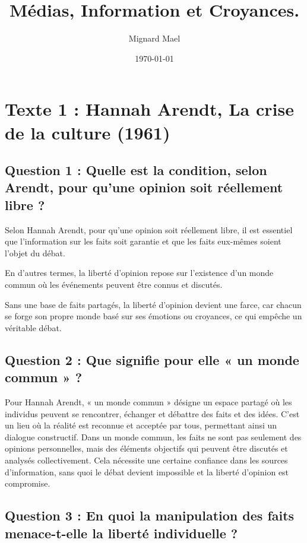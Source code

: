 \documentclass[a4paper,12pt]{article}
\title{Médias, Information et Croyances.}
\author{Mignard Mael}
\date{\today}
\begin{document}
\maketitle

\section*{Texte 1 : Hannah Arendt, La crise de la culture (1961)}
\vspace{1cm}

\subsection*{Question 1 : Quelle est la condition, selon Arendt, pour qu’une opinion soit réellement libre ?}
Selon Hannah Arendt, pour qu’une opinion soit réellement libre, il est essentiel que l’information sur les faits soit garantie et que les faits eux-mêmes soient l’objet du débat. 

En d'autres termes, la liberté d’opinion repose sur l’existence d’un monde commun où les événements peuvent être connus et discutés. 

Sans une base de faits partagés, la liberté d’opinion devient une farce, car chacun se forge son propre monde basé sur ses émotions ou croyances, ce qui empêche un véritable débat.

\subsection*{Question 2 : Que signifie pour elle « un monde commun » ?} 

Pour Hannah Arendt, « un monde commun » désigne un espace partagé où les individus peuvent se rencontrer, échanger et débattre des faits et des idées. C'est un lieu où la réalité est reconnue et acceptée par tous, permettant ainsi un dialogue constructif. Dans un monde commun, les faits ne sont pas seulement des opinions personnelles, mais des éléments objectifs qui peuvent être discutés et analysés collectivement. Cela nécessite une certaine confiance dans les sources d'information, sans quoi le débat devient impossible et la liberté d'opinion est compromise.

\subsection*{Question 3 : En quoi la manipulation des faits menace-t-elle la liberté individuelle ?}
\end{document}
